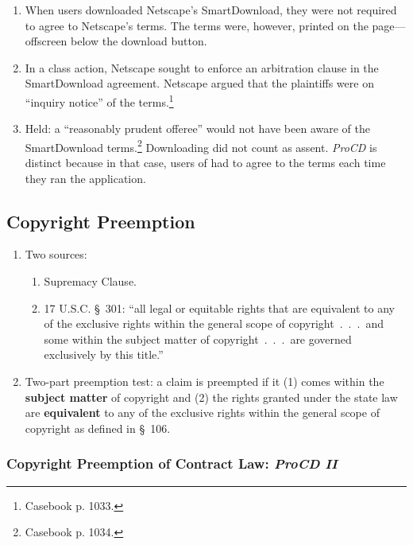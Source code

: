 \begin{enumerate}
    \item When users downloaded Netscape's SmartDownload, they were not 
    required to agree to Netscape's terms. The terms were, however, printed on 
    the page---offscreen below the download button.
    \item In a class action, Netscape sought to enforce an arbitration clause 
    in the SmartDownload agreement. Netscape argued that the plaintiffs were 
    on ``inquiry notice'' of the terms.\footnote{Casebook p. 1033.}
    \item Held: a ``reasonably prudent offeree'' would not have been aware of 
    the SmartDownload terms.\footnote{Casebook p. 1034.} Downloading did not 
    count as assent. \emph{ProCD} is distinct because in that case, users of 
    had to agree to the terms each time they ran the application.
\end{enumerate}

\subsection{Copyright Preemption}

\begin{enumerate}
    \item Two sources:
    \begin{enumerate}
        \item Supremacy Clause.
        \item 17 U.S.C. \S\ 301: ``all legal or equitable rights that are 
        equivalent to any of the exclusive rights within the general scope of 
        copyright~.~.~.~and some within the subject matter of 
        copyright~.~.~.~are governed exclusively by this title.''
    \end{enumerate}
    \item Two-part preemption test: a claim is preempted if it (1) comes 
    within the \textbf{subject matter} of copyright and (2) the rights granted 
    under the state law are \textbf{equivalent} to any of the exclusive rights 
    within the general scope of copyright as defined in \S\ 106.
\end{enumerate}

\subsubsection{Copyright Preemption of Contract Law: \emph{ProCD II}}


